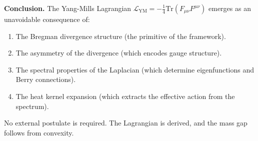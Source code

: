 \textbf{Conclusion.} The Yang-Mills Lagrangian $\mathcal{L}_{\text{YM}} = -\frac{1}{4} \text{Tr}(F_{\mu\nu}F^{\mu\nu})$ emerges as an unavoidable consequence of:
\begin{enumerate}
\item The Bregman divergence structure (the primitive of the framework).
\item The asymmetry of the divergence (which encodes gauge structure).
\item The spectral properties of the Laplacian (which determine eigenfunctions and Berry connections).
\item The heat kernel expansion (which extracts the effective action from the spectrum).
\end{enumerate}

No external postulate is required. The Lagrangian is derived, and the mass gap follows from convexity.
